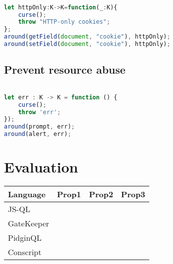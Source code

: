 \begin{lstlisting}[label={lst:Policy8Conscript},language=JavaScript,caption=Policy 8 in ConScript,mathescape=true]  % float=t?

let httpOnly:K->K=function(_:K){ 
    curse(); 
    throw "HTTP-only cookies"; 
};
around(getField(document, "cookie"), httpOnly); 
around(setField(document, "cookie"), httpOnly);
\end{lstlisting}

\subsection{Prevent resource abuse}

\begin{lstlisting}[label={lst:Policy9Conscript},language=JavaScript,caption=Policy 9 in ConScript,mathescape=true]  % float=t?

let err : K -> K = function () { 
    curse(); 
    throw 'err'; 
}); 
around(prompt, err); 
around(alert, err);
\end{lstlisting}

\section{Evaluation}
\label{sec:ValidationEvaluation}

\begin{center}
    \begin{tabular}{ | l || l | l | l |}
    \hline
    Language & Prop1 & Prop2 & Prop3 \\ \hline
    JS-QL &  &  & \\ \hline
    GateKeeper &  &  & \\ \hline
    PidginQL &  &  & \\ \hline
    Conscript &  &  & \\ \hline
    \end{tabular}
\end{center}
